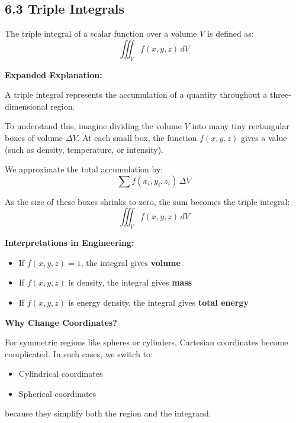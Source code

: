 \subsection*{6.3 Triple Integrals}

\begin{conceptbox}
    The triple integral of a scalar function over a volume $V$ is defined as:
    \begin{equation*}
        \iiint_V f(x,y,z)\, dV
    \end{equation*}
\end{conceptbox}

\textbf{Expanded Explanation:}

A triple integral represents the accumulation of a quantity throughout a three-dimensional region.

To understand this, imagine dividing the volume $V$ into many tiny rectangular boxes of volume $\Delta V$. At each small box, the function $f(x,y,z)$ gives a value (such as density, temperature, or intensity).

We approximate the total accumulation by:
\begin{equation*}
    \sum f(x_i,y_i,z_i)\,\Delta V
\end{equation*}

As the size of these boxes shrinks to zero, the sum becomes the triple integral:
\begin{equation*}
    \iiint_V f(x,y,z)\, dV
\end{equation*}

\textbf{Interpretations in Engineering:}
\begin{itemize}
    \item If $f(x,y,z)=1$, the integral gives \textbf{volume}
    \item If $f(x,y,z)$ is density, the integral gives \textbf{mass}
    \item If $f(x,y,z)$ is energy density, the integral gives \textbf{total energy}
\end{itemize}

\textbf{Why Change Coordinates?}

For symmetric regions like spheres or cylinders, Cartesian coordinates become complicated. In such cases, we switch to:
\begin{itemize}
    \item Cylindrical coordinates
    \item Spherical coordinates
\end{itemize}

because they simplify both the region and the integrand.

